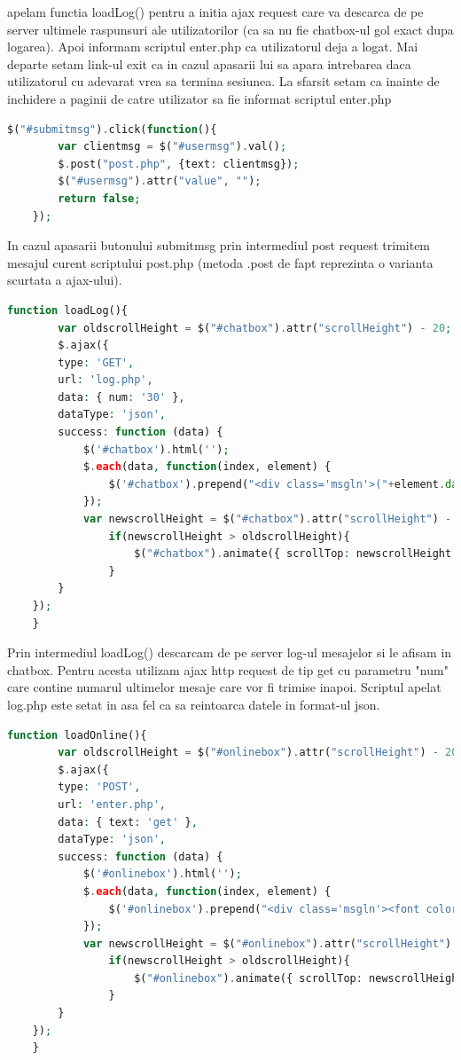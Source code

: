 \documentclass[12pt]{article}
\begin{document}
apelam functia loadLog() pentru a initia ajax request care va descarca de pe server ultimele raspunsuri ale utilizatorilor (ca sa nu fie chatbox-ul gol exact dupa logarea). Apoi informam scriptul enter.php ca utilizatorul deja a logat. Mai departe setam link-ul exit ca in cazul apasarii lui sa apara intrebarea daca utilizatorul cu adevarat vrea sa termina sesiunea. La sfarsit setam ca inainte de inchidere a paginii de catre utilizator sa fie informat scriptul enter.php
\newpage
\begin{lstlisting}[language=php, caption={Fisierul index.php. Trimiterea mesajelor scrise de utilizator}, label=list2]
$("#submitmsg").click(function(){	
		var clientmsg = $("#usermsg").val();
		$.post("post.php", {text: clientmsg});				
		$("#usermsg").attr("value", "");
		return false;
	});
\end{lstlisting}
In cazul apasarii butonului submitmsg prin intermediul post request trimitem mesajul curent scriptului post.php (metoda .post de fapt reprezinta o varianta scurtata a ajax-ului).
\begin{lstlisting}[language=php, caption={Fisierul index.php. metoda loadLog()}, label=list2]
function loadLog(){      
        var oldscrollHeight = $("#chatbox").attr("scrollHeight") - 20;
        $.ajax({ 
        type: 'GET', 
        url: 'log.php', 
        data: { num: '30' }, 
        dataType: 'json',
        success: function (data) { 
            $('#chatbox').html('');
            $.each(data, function(index, element) {
                $('#chatbox').prepend("<div class='msgln'>("+element.datetime+") <b>"+element.nick+"</b>: "+element.msg+"<br></div>");
            });
            var newscrollHeight = $("#chatbox").attr("scrollHeight") - 20;
                if(newscrollHeight > oldscrollHeight){
                    $("#chatbox").animate({ scrollTop: newscrollHeight }, 'normal');
                }               
        }
    });
    }
\end{lstlisting}
Prin intermediul loadLog() descarcam de pe server log-ul mesajelor si le afisam in chatbox. Pentru acesta utilizam ajax http request de tip get cu parametru "num" care contine numarul ultimelor mesaje care vor fi trimise inapoi. Scriptul apelat log.php este setat in asa fel ca sa reintoarca datele in format-ul json. 
\newpage
\begin{lstlisting}[language=php, caption={Fisierul index.php. metoda loadOnline()}, label=list2]
function loadOnline(){      
        var oldscrollHeight = $("#onlinebox").attr("scrollHeight") - 20;
        $.ajax({ 
        type: 'POST', 
        url: 'enter.php', 
        data: { text: 'get' }, 
        dataType: 'json',
        success: function (data) { 
            $('#onlinebox').html('');
            $.each(data, function(index, element) {
                $('#onlinebox').prepend("<div class='msgln'><font color='red'><b>"+element.nick+"</b></font><br></div>");
            });
            var newscrollHeight = $("#onlinebox").attr("scrollHeight") - 20;
                if(newscrollHeight > oldscrollHeight){
                    $("#onlinebox").animate({ scrollTop: newscrollHeight }, 'normal');
                }               
        }
    });
    }\end{lstlisting}
\end{document}
